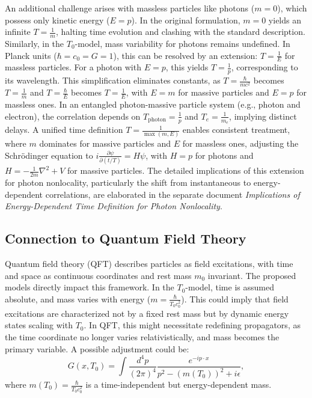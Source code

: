 \documentclass[a4paper,12pt]{article}
\begin{document}
	An additional challenge arises with massless particles like photons (\( m = 0 \)), which possess only kinetic energy (\( E = p \)). In the original formulation, \( m = 0 \) yields an infinite \( T = \frac{1}{m} \), halting time evolution and clashing with the standard description. Similarly, in the \( T_0 \)-model, mass variability for photons remains undefined. In Planck units (\( \hbar = c_0 = G = 1 \)), this can be resolved by an extension: \( T = \frac{1}{E} \) for massless particles. For a photon with \( E = p \), this yields \( T = \frac{1}{p} \), corresponding to its wavelength. This simplification eliminates constants, as \( T = \frac{\hbar}{m c^2} \) becomes \( T = \frac{1}{m} \) and \( T = \frac{\hbar}{E} \) becomes \( T = \frac{1}{E} \), with \( E = m \) for massive particles and \( E = p \) for massless ones. In an entangled photon-massive particle system (e.g., photon and electron), the correlation depends on \( T_\text{photon} = \frac{1}{p} \) and \( T_e = \frac{1}{m_e} \), implying distinct delays. A unified time definition \( T = \frac{1}{\max(m, E)} \) enables consistent treatment, where \( m \) dominates for massive particles and \( E \) for massless ones, adjusting the Schrödinger equation to \( i \frac{\partial \psi}{\partial (t/T)} = H \psi \), with \( H = p \) for photons and \( H = -\frac{1}{2m} \nabla^2 + V \) for massive particles. The detailed implications of this extension for photon nonlocality, particularly the shift from instantaneous to energy-dependent correlations, are elaborated in the separate document \textit{Implications of Energy-Dependent Time Definition for Photon Nonlocality}.
	
	\subsection{Connection to Quantum Field Theory}
	Quantum field theory (QFT) describes particles as field excitations, with time and space as continuous coordinates and rest mass \( m_0 \) invariant. The proposed models directly impact this framework. In the \( T_0 \)-model, time is assumed absolute, and mass varies with energy (\( m = \frac{\hbar}{T_0 c_0^2} \)). This could imply that field excitations are characterized not by a fixed rest mass but by dynamic energy states scaling with \( T_0 \). In QFT, this might necessitate redefining propagators, as the time coordinate no longer varies relativistically, and mass becomes the primary variable. A possible adjustment could be:
	\[
	G(x, T_0) = \int \frac{d^4p}{(2\pi)^4} \frac{e^{-ip \cdot x}}{p^2 - (m(T_0))^2 + i\epsilon},
	\]
	where \( m(T_0) = \frac{\hbar}{T_0 c_0^2} \) is a time-independent but energy-dependent mass.
	
\end{document}
